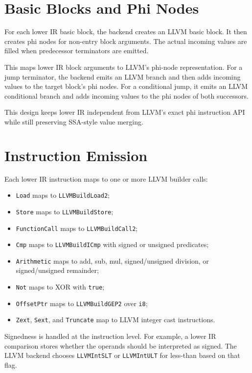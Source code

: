 \section{Basic Blocks and Phi Nodes}

For each lower IR basic block, the backend creates an LLVM basic block. It then
creates phi nodes for non-entry block arguments. The actual incoming values are
filled when predecessor terminators are emitted.

This maps lower IR block arguments to LLVM's phi-node representation. For a
jump terminator, the backend emits an LLVM branch and then adds incoming values
to the target block's phi nodes. For a conditional jump, it emits an LLVM
conditional branch and adds incoming values to the phi nodes of both successors.

This design keeps lower IR independent from LLVM's exact phi instruction API
while still preserving SSA-style value merging.

\section{Instruction Emission}

Each lower IR instruction maps to one or more LLVM builder calls:

\begin{itemize}
  \item \texttt{Load} maps to \texttt{LLVMBuildLoad2};
  \item \texttt{Store} maps to \texttt{LLVMBuildStore};
  \item \texttt{FunctionCall} maps to \texttt{LLVMBuildCall2};
  \item \texttt{Cmp} maps to \texttt{LLVMBuildICmp} with signed or unsigned
        predicates;
  \item \texttt{Arithmetic} maps to add, sub, mul, signed/unsigned division, or
        signed/unsigned remainder;
  \item \texttt{Not} maps to XOR with \texttt{true};
  \item \texttt{OffsetPtr} maps to \texttt{LLVMBuildGEP2} over \texttt{i8};
  \item \texttt{Zext}, \texttt{Sext}, and \texttt{Truncate} map to LLVM integer
        cast instructions.
\end{itemize}

Signedness is handled at the instruction level. For example, a lower IR
comparison stores whether the operands should be interpreted as signed. The LLVM
backend chooses \texttt{LLVMIntSLT} or \texttt{LLVMIntULT} for less-than based
on that flag.

